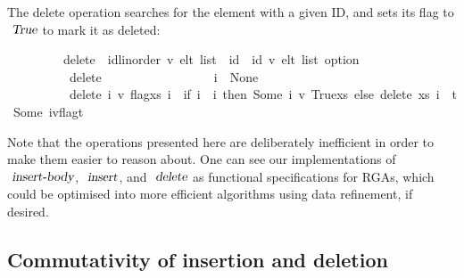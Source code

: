 The delete operation searches for the element with a given ID, and sets its flag to $\isa{True}$ to mark it as deleted:
\vspace{0.275em}
\begin{isabellebody}
\ \ \ \ \ \ \ \ \ delete\ {\isacharcolon}{\isacharcolon}\ {\isachardoublequoteopen}{\isacharparenleft}{\isacharprime}id{\isacharcolon}{\isacharcolon}{\isacharbraceleft}linorder{\isacharbraceright}{\isacharcomma}\ {\isacharprime}v{\isacharparenright}\ elt\ list\ {\isasymRightarrow}\ {\isacharprime}id\ {\isasymRightarrow}\ {\isacharparenleft}{\isacharprime}id{\isacharcomma}\ {\isacharprime}v{\isacharparenright}\ elt\ list\ option{\isachardoublequoteclose}\ \isanewline
\ \ \ \ \ \ \ \ \ \ {\isachardoublequoteopen}delete\ {\isacharbrackleft}{\isacharbrackright}\ \ \ \ \ \ \ \ \ \ \ \ \ \ \ \ \ i\ {\isacharequal}\ None{\isachardoublequoteclose}\ {\isacharbar}\isanewline
\ \ \ \ \ \ \ \ \ \ {\isachardoublequoteopen}delete\ {\isacharparenleft}{\isacharparenleft}i{\isacharprime}{\isacharcomma}\ v{\isacharcomma}\ flag{\isacharparenright}{\isacharhash}xs{\isacharparenright}\ i\ {\isacharequal}\ {\isacharparenleft}if\ i{\isacharprime}\ {\isacharequal}\ i\ then\ Some\ {\isacharparenleft}{\isacharparenleft}i{\isacharprime}{\isacharcomma}\ v{\isacharcomma}\ True{\isacharparenright}{\isacharhash}xs{\isacharparenright}\ else\ delete\ xs\ i\ {\isasymbind}\ {\isacharparenleft}{\isasymlambda}t{\isachardot}\ Some\ {\isacharparenleft}{\isacharparenleft}i{\isacharprime}{\isacharcomma}v{\isacharcomma}flag{\isacharparenright}{\isacharhash}t{\isacharparenright}{\isacharparenright}{\isacharparenright}{\isachardoublequoteclose}%
\end{isabellebody}
\vspace{0.275em}
Note that the operations presented here are deliberately inefficient in order to make them easier to reason about.
One can see our implementations of $\isa{insert-body}$, $\isa{insert}$, and $\isa{delete}$ as functional specifications for RGAs, which could be optimised into more efficient algorithms using data refinement, if desired.

\subsection{Commutativity of insertion and deletion}

